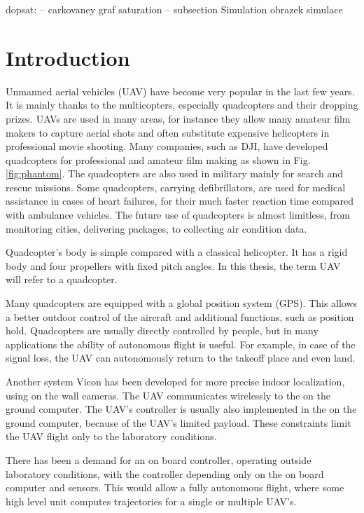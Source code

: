 \documentclass[a4paper,11pt,titlepage]{article}
\begin{document}
dopsat:
-- carkovaney graf saturation
-- subsection Simulation obrazek simulace

\section{Introduction}
Unmanned aerial vehicles (UAV) have become very popular in the last few years. It is mainly thanks to the multicopters, especially quadcopters and their dropping prizes. UAVs are used in many areas, for instance they allow many amateur film makers to capture aerial shots and often substitute expensive helicopters in professional movie shooting. Many companies, such as DJI, have developed quadcopters for professional and amateur film making as shown in Fig. \ref{fig:phantom}. The quadcopters are also used in military\cite{military} mainly for search and rescue missions. Some quadcopters\cite{tu_delft}, carrying defibrillators, are used for medical assistance in cases of heart failures, for their much faster reaction time compared with ambulance vehicles. The future use of quadcopters is almost limitless, from monitoring cities, delivering packages, to collecting air condition data. 

Quadcopter's body is simple compared with a classical helicopter. It has a rigid body and four propellers with fixed pitch angles. In this thesis, the term UAV will refer to a quadcopter.

Many quadcopters are equipped with a global position system (GPS). This allows a better outdoor control of the aircraft and additional functions, such as position hold. Quadcopters are usually directly controlled by people, but in many applications the ability of autonomous flight is useful. For example, in case of the signal loss, the UAV can autonomously return to the takeoff place and even land.

Another system Vicon has been developed for more precise indoor localization, using on the wall cameras. The UAV communicates wirelessly to the on the ground computer. The UAV's controller is usually also implemented in the on the ground computer, because of the UAV's limited payload. These constraints limit the UAV flight only to the laboratory conditions.

There has been a demand for an on board controller, operating outside laboratory conditions, with the controller depending only on the on board computer and sensors. This would allow a fully autonomous flight, where some high level unit computes trajectories for a single or multiple UAV's.
\end{document}
